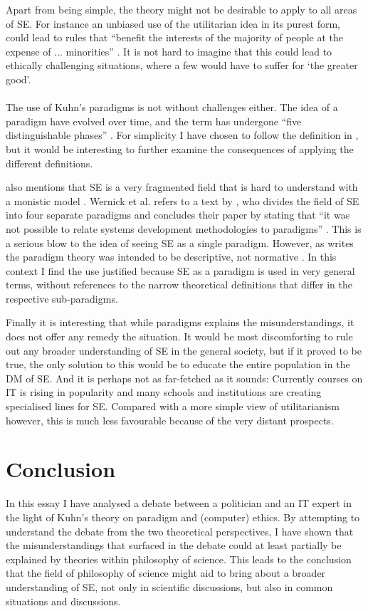 \documentclass{article}
\begin{document}
Apart from being simple, the theory might not be desirable to apply to all areas of SE. For instance an unbiased use of the utilitarian idea in its purest form, could lead to rules that ``benefit the interests of the majority of people at the expense of ... minorities'' \citep[p. 205]{Holm:2014, McKinnon:2008}. It is not hard to imagine that this could lead to ethically challenging situations, where a few would have to suffer for `the greater good'.
\\
\\
The use of Kuhn's paradigms is not without challenges either. The idea of a paradigm have evolved over time, and the term has undergone ``five distinguishable phases'' \citep[p. 49]{Banville:1989}. For simplicity I have chosen to follow the definition in \cite{Holm:2014}, but it would be interesting to further examine the consequences of applying the different definitions.
 
\cite{Banville:1989} also mentions that SE is a very fragmented field that is hard to understand with a monistic model \citep[p. 58]{Banville:1989}. Wernick et al. refers to a text by \cite{Hirschheim:1989}, who divides the field of SE into four separate paradigms and concludes their paper by stating that ``it was not possible to relate systems development methodologies to paradigms'' \citep[p. 1214]{Hirschheim:1989}. This is a serious blow to the idea of seeing SE as a single paradigm. However, as \cite{Wernick:2004} writes the paradigm theory was intended to be descriptive, not normative \citep[p. 239]{Wernick:2004}. In this context I find the use justified because SE as a paradigm is used in very general terms, without references to the narrow theoretical definitions that differ in the respective sub-paradigms.

Finally it is interesting that while paradigms explains the misunderstandings, it does not offer any remedy the situation. It would be most discomforting to rule out any broader understanding of SE in the general society, but if it proved to be true, the only solution to this would be to educate the entire population in the DM of SE. And it is perhaps not as far-fetched as it sounds: Currently courses on IT is rising in popularity and many schools and institutions are creating specialised lines for SE. Compared with a more simple view of utilitarianism however, this is much less favourable because of the very distant prospects.

\section{Conclusion}
In this essay I have analysed a debate between a politician and an IT expert in the light of Kuhn's theory on paradigm and (computer) ethics. By attempting to understand the debate from the two theoretical perspectives, I have shown that the misunderstandings that surfaced in the debate could at least partially be explained by theories within philosophy of science. This leads to the conclusion that the field of philosophy of science might aid to bring about a broader understanding of SE, not only in scientific discussions, but also in common situations and discussions. 
\end{document}
